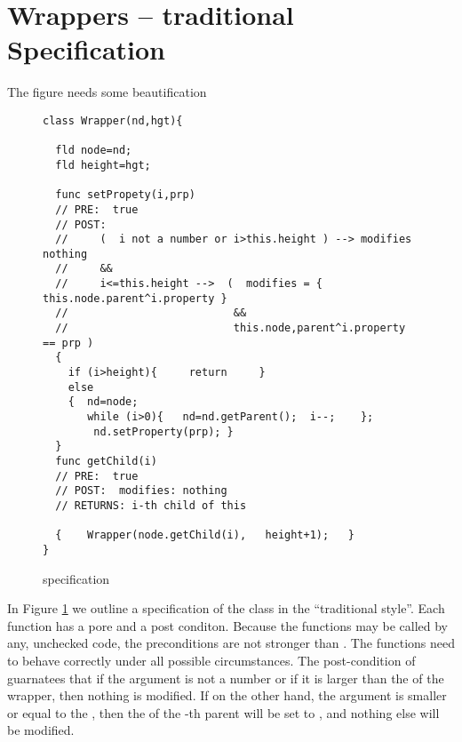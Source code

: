 \section{Wrappers -- traditional Specification}
\label{DOM:traditional}
The figure needs some beautification

\begin{figure}[htb]
\begin{lstlisting}
class Wrapper(nd,hgt){

  fld node=nd;
  fld height=hgt;

  func setPropety(i,prp)
  // PRE:  true
  // POST:
  //     (  i not a number or i>this.height ) --> modifies nothing  
  //     &&
  //     i<=this.height -->  (  modifies = { this.node.parent^i.property }
  //                          &&
  //                          this.node,parent^i.property == prp )
  {
    if (i>height){     return     } 
    else  
    {  nd=node;  
       while (i>0){   nd=nd.getParent();  i--;    };
        nd.setProperty(prp); }
  }    
  func getChild(i)
  // PRE:  true
  // POST:  modifies: nothing
  // RETURNS: i-th child of this
  
  {    Wrapper(node.getChild(i),   height+1);   }                           
}
\end{lstlisting}
 \vspace*{-7mm}
\caption{ specification}
\label{fig:WrapperSpec}
\end{figure}

In Figure \ref{fig:WrapperSpec} we  outline a specification of the class  in the ``traditional style''. Each function has a pore and a post conditon. Because the functions may be called by any, unchecked code, the preconditions are not stronger than . The functions need to behave correctly under all possible circumstances.  The post-condition of  guarnatees that if the argument is not a number or if it is larger than the  of the wrapper, then nothing is modified. If on the other hand, the argument is smaller or equal to the , then the  of the -th parent will be set to , and nothing else will be modified.